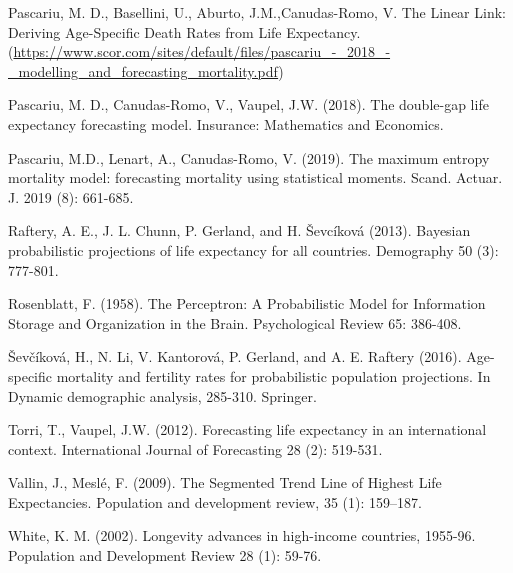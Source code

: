 \documentclass[a4,11pt]{article}
\begin{document}
\begin{thebibliography}{99}
Pascariu, M. D., Basellini, U., Aburto, J.M.,Canudas-Romo, V. The Linear Link: Deriving Age-Specific Death Rates from Life Expectancy. (\url{https://www.scor.com/sites/default/files/pascariu_-_2018_-_modelling_and_forecasting_mortality.pdf})

Pascariu, M. D., Canudas-Romo, V., Vaupel, J.W. (2018). The double-gap life expectancy forecasting model. Insurance: Mathematics and Economics.

Pascariu, M.D., Lenart, A., Canudas-Romo, V. (2019). The maximum entropy mortality model: forecasting mortality using statistical moments. Scand. Actuar. J. 2019 (8): 661-685.
		
Raftery, A. E., J. L. Chunn, P. Gerland, and H. Ševcíková (2013). Bayesian probabilistic projections of life expectancy for all countries. Demography 50 (3): 777-801.

Rosenblatt, F. (1958). The Perceptron: A Probabilistic Model for Information Storage and Organization in the Brain. Psychological Review 65: 386-408.
	
\v{S}ev\v{c}\'{i}kov\'{a}, H., N. Li, V. Kantorov\'{a}, P. Gerland, and A. E. Raftery (2016). Age-specific mortality and fertility rates for probabilistic population projections. In Dynamic demographic analysis, 285-310. Springer.


Torri, T., Vaupel, J.W. (2012). Forecasting life expectancy in an international context. International Journal of Forecasting 28 (2): 519-531.

Vallin, J., Mesl\'e, F. (2009). The Segmented Trend Line of Highest Life Expectancies. Population and development review, 35 (1): 159--187.
		
White, K. M. (2002). Longevity advances in high-income countries, 1955-96. Population and Development Review 28 (1): 59-76.
		
\end{thebibliography}
\end{document}
